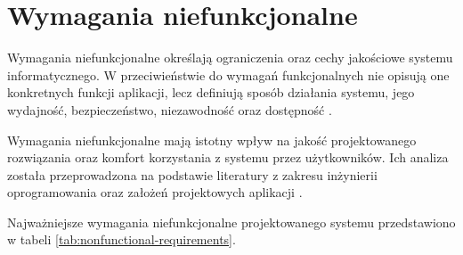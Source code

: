 \section{Wymagania niefunkcjonalne}

Wymagania niefunkcjonalne określają ograniczenia oraz cechy jakościowe systemu informatycznego. W przeciwieństwie do wymagań funkcjonalnych nie opisują one konkretnych funkcji aplikacji, lecz definiują sposób działania systemu, jego wydajność, bezpieczeństwo, niezawodność oraz dostępność \cite{www4}. 

Wymagania niefunkcjonalne mają istotny wpływ na jakość projektowanego rozwiązania oraz komfort korzystania z systemu przez użytkowników. Ich analiza została przeprowadzona na podstawie literatury z zakresu inżynierii oprogramowania oraz założeń projektowych aplikacji \cite{1}.

Najważniejsze wymagania niefunkcjonalne projektowanego systemu przedstawiono w tabeli \ref{tab:nonfunctional-requirements}.

